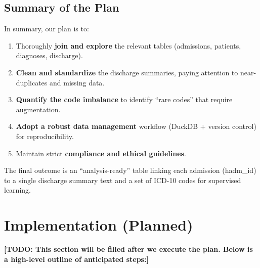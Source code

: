 \documentclass[12pt,a4paper]{report}
\begin{document}
\subsection{Summary of the Plan}
In summary, our plan is to:
\begin{enumerate}
    \item Thoroughly \textbf{join and explore} the relevant tables (admissions, patients, diagnoses, discharge).
    \item \textbf{Clean and standardize} the discharge summaries, paying attention to near-duplicates and missing data.
    \item \textbf{Quantify the code imbalance} to identify “rare codes” that require augmentation.
    \item \textbf{Adopt a robust data management} workflow (DuckDB + version control) for reproducibility.
    \item Maintain strict \textbf{compliance and ethical guidelines}.
\end{enumerate}
The final outcome is an “analysis-ready” table linking each admission (hadm\_id) to a single discharge summary text and a set of ICD-10 codes for supervised learning.

\section{Implementation (Planned)}

\textbf{[TODO: This section will be filled after we execute the plan. Below is a high-level outline of anticipated steps:]} 
\end{document}
